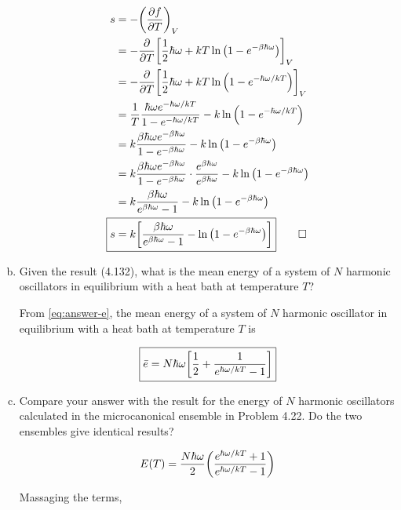 \documentclass[9pt,a4paper,twocolumn]{article}
\begin{document}
\begin{enumerate}[(a)]
\begin{align}
	s &= -\qty(\pdv{f}{T})_V \label{eq:entropy} \\
	&= -\pdv{T}\qty[\frac{1}{2}\hbar\omega + kT\ln\qty(1 - e^{-\beta\hbar\omega})]_V \nonumber \\
	&= -\pdv{T}\qty[\frac{1}{2}\hbar\omega + kT\ln\qty(1 - e^{-\hbar\omega/kT})]_V \nonumber \\
	&= \frac{1}{T}\frac{\hbar\omega e^{-\hbar\omega/kT}}{1-e^{-\hbar\omega/kT}} - k\ln\qty(1 - e^{-\hbar\omega/kT}) \nonumber \\
	&= k\frac{\beta\hbar\omega e^{-\beta\hbar\omega}}{1-e^{-\beta\hbar\omega}} - k\ln\qty(1 - e^{-\beta\hbar\omega}) \nonumber \\
	&= k\frac{\beta\hbar\omega e^{-\beta\hbar\omega}}{1-e^{-\beta\hbar\omega}} \cdot \frac{e^{\beta\hbar\omega}}{e^{\beta\hbar\omega}} - k\ln\qty(1 - e^{-\beta\hbar\omega}) \nonumber \\
	&= k\frac{\beta\hbar\omega}{e^{\beta\hbar\omega} - 1} - k\ln\qty(1 - e^{-\beta\hbar\omega}) \nonumber \\
	\Aboxed{
		s &= k\qty[\frac{\beta\hbar\omega}{e^{\beta\hbar\omega} - 1} - \ln\qty(1 - e^{-\beta\hbar\omega})]
	} \qed \label{eq:answer-s}
\end{align}

\item Given the result (4.132), what is the mean energy of a system of $N$ harmonic oscillators in equilibrium with a heat bath at temperature $T$?

From \eqref{eq:answer-e}, the mean energy of a system of $N$ harmonic oscillator in equilibrium with a heat bath at temperature $T$ is

\begin{equation}
	\boxed{
	\bar{e} = N\hbar\omega\qty[\frac{1}{2} + \frac{1}{e^{\hbar\omega/kT} - 1}]
	} \label{eq:answer-b}
\end{equation}

\item Compare your answer with the result for the energy of $N$ harmonic oscillators calculated in the microcanonical ensemble in Problem 4.22. Do the two ensembles give identical results?

\begin{equation}
	E(T) = \frac{N\hbar\omega}{2}\qty(\frac{e^{\hbar\omega/kT} + 1}{e^{\hbar\omega/kT} - 1}) \label{eq:problem422}
\end{equation}

Massaging the terms,


\end{enumerate}
\end{document}
